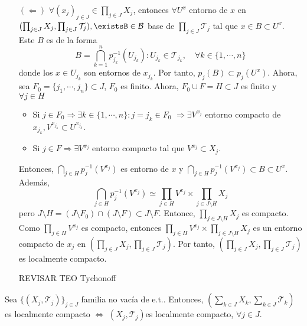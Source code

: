 \begin{dem}
\begin{enumerate}[label=(\roman*)]
    \item [$(\Leftarrow)$] $\forall ( x_{j} )_{j \in J} \in \prod_{j \in J} X_{j}$, entonces $\forall U^{x}$ entorno de $x$ en $( \prod_{j \in J} X_{j}, \prod_{j \in J} \mathcal{T}_{j} ), \existsB \in \mathcal{B}$ base de $\prod_{j \in J} \mathcal{T}_{j}$ tal que $ x \in B \subset U^{x}$. Este $B$ es de la forma
      \[ 
        B = \bigcap_{k = 1}^{n} p_{j_{k}}^{-1}(U_{j_{k}}) : U_{j_{k}} \in \mathcal{T}_{j_{k}}, \quad \forall k \in \{ 1, \cdots, n \} 
      \] 
      donde los $x \in U_{j_{k}}$ son entornos de $x_{j_{k}}$. Por tanto, $p_{j}(B) \subset p_{j}(U^{x})$. Ahora, sea $F_{0} = \{ j_{1}, \cdots, j_{n} \}\subset J$, $F_{0}$ es finito. Ahora, $F_{0} \cup F = H \subset J$ es finito y $\forall j \in H$
        \begin{itemize}
          \item Si $j \in F_{0} \Rightarrow \exists k \in \{ 1, \cdots, n \} : j = j_{k} \in F_{0}$ $\Rightarrow \exists V^{x_{j}}$ entorno compacto de $x_{j_{k}}, V^{x_{j_{k}}} \subset U^{x_{j_{k}}}$.
          \item Si $ j \in F \Rightarrow \exists V^{x_{j}}$ entorno compacto tal que $V^{x_{j}} \subset X_{j}$.
        \end{itemize}
      Entonces, $\bigcap_{j \in H} p_{j} ^{-1}(V^{x_{j}})$ es entorno de $x$ y $\bigcap_{j \in H} p_{j} ^{-1}(V^{x_{j}}) \subset B \subset U^{x}$. Además,
      \[
        \bigcap_{j \in H} p_{j} ^{-1}(V^{x_{j}}) \simeq \prod_{j \in H} V^{x_{j}} \times \prod_{j \in J \setminus H} X_{j}
      \]
      pero $J \setminus H = (J \setminus F_{0}) \cap (J \setminus F) \subset J \setminus F$. Entonce, $\prod_{j \in J \setminus H} X_{j}$ es compacto. Como $\prod_{j \in H} V^{x_{j}}$ es compacto, entonces $\prod_{j \in H} V^{x_{j}} \times \prod_{j \in J \setminus H} X_{j}$ es un entorno compacto de $x_{j}$ en $( \prod_{j \in J} X_{j}, \prod_{j \in J} \mathcal{T}_{j} )$. Por tanto, $( \prod_{j \in J} X_{j}, \prod_{j \in J} \mathcal{T}_{j} )$ es localmente compacto. 

      REVISAR TEO Tychonoff

  \end{enumerate}
\end{dem}

\begin{prop}
  Sea $\{ ( X_{j}, \mathcal{T}_{j} ) \}_{j \in J}$ familia no vacía de e.t.. Entonces, $( \sum_{k \in J} X_{k}, \sum_{k \in J} \mathcal{T}_{k})$ es localmente compacto $\Leftrightarrow$ $( X_{j}, \mathcal{T}_{j} )$es localmente compacto, $\forall j \in J$.
\end{prop}

